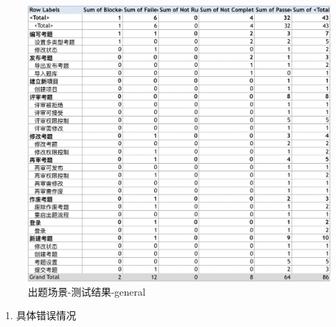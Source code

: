 \documentclass[hyperref, a4paper]{ctexart}
\providecommand{\tightlist}{%
  \setlength{\itemsep}{0pt}\setlength{\parskip}{0pt}}
\begin{document}
\begin{figure}
\centering
\includegraphics{screenshoots/PivotTable_general.png}
\caption{出题场景-测试结果-general}
\end{figure}

\begin{enumerate}
\def\labelenumi{\arabic{enumi}.}
\setcounter{enumi}{2}
\tightlist
\item
  具体错误情况
\end{enumerate}
\end{document}
